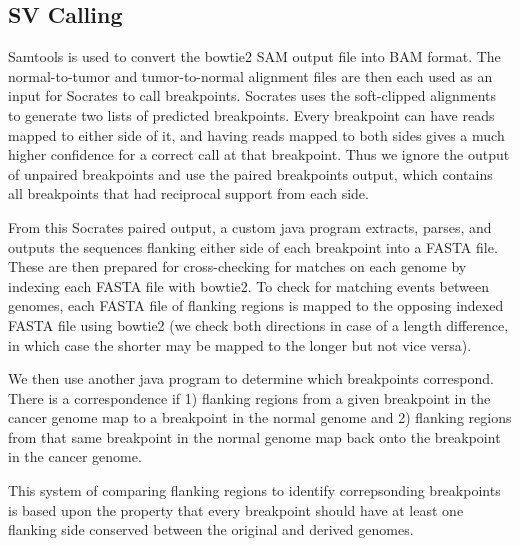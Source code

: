 \documentclass{easychithesis}
\begin{document}
\subsection{SV Calling}
Samtools is used to convert the bowtie2 SAM output file into BAM format. The normal-to-tumor and tumor-to-normal alignment files are then each used as an input for Socrates to call breakpoints. Socrates uses the soft-clipped alignments to generate two lists of predicted breakpoints. Every breakpoint can have reads mapped to either side of it, and having reads mapped to both sides gives a much higher confidence for a correct call at that breakpoint. Thus we ignore the output of unpaired breakpoints and use the paired breakpoints output, which contains all breakpoints that had reciprocal support from each side. 

From this Socrates paired output, a custom java program extracts, parses, and outputs the sequences flanking either side of each breakpoint into a FASTA file. These are then prepared for cross-checking for matches on each genome by indexing each FASTA file with bowtie2. To check for matching events between genomes, each FASTA file of flanking regions is mapped to the opposing indexed FASTA file using bowtie2 (we check both directions in case of a length difference, in which case the shorter may be mapped to the longer but not vice versa).

We then use another java program to determine which breakpoints correspond. There is a correspondence if 1) flanking regions from a given breakpoint in the cancer genome map to a breakpoint in the normal genome and 2) flanking regions from that same breakpoint in the normal genome map back onto the breakpoint in the cancer genome.

This system of comparing flanking regions to identify correpsonding breakpoints is based upon the property that every breakpoint should have at least one flanking side conserved between the original and derived genomes.
\end{document}
